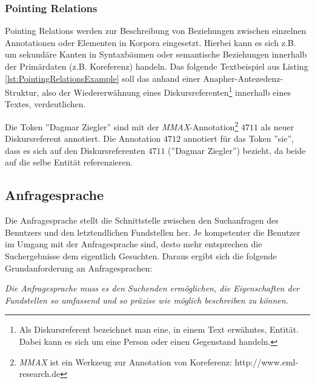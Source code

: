 \subsubsection{Pointing Relations}\label{sec:Pointing Relations}

Pointing Relations werden zur Beschreibung von Beziehungen zwischen einzelnen Annotationen oder Elementen in Korpora eingesetzt. Hierbei kann es sich z.B. um sekundäre Kanten in Syntaxbäumen oder semantische Beziehungen innerhalb der Primärdaten (z.B. Koreferenz) handeln. Das folgende Textbeispiel aus Listing \ref{lst:PointingRelationsExample} soll das anhand einer Anapher-Antezedenz-Struktur, also der Wiedererwähnung eines Diskursreferenten\footnote{Als Diskursreferent bezeichnet man eine, in einem Text erwähntes, Entität. Dabei kann es sich um eine Person oder einen Gegenstand handeln.} innerhalb eines Textes, verdeutlichen.

\newpage
{}



Die Token ''Dagmar Ziegler'' sind mit der \emph{MMAX}-Annotation\footnote{\emph{MMAX} ist ein Werkzeug zur Annotation von Koreferenz: http://www.eml-research.de} $4711$ als neuer Diskursreferent annotiert. Die Annotation $4712$ annotiert für  das Token ''sie'', dass es sich auf den Diskursreferenten $4711$ (''Dagmar Ziegler'') bezieht, da beide auf die selbe Entität referenzieren.

\subsection{Anfragesprache}\label{sec:Korpussuche.Anfragesprache}

Die Anfragesprache stellt die Schnittstelle zwischen den Suchanfragen des Benutzers und den letztendlichen Fundstellen her. Je kompetenter die Benutzer im Umgang mit der Anfragesprache sind, desto mehr entsprechen die Suchergebnisse dem eigentlich Gesuchten. Daraus ergibt sich die folgende Grundanforderung an Anfragesprachen:

\emph{Die Anfragesprache muss es den Suchenden ermöglichen, die Eigenschaften der Fundstellen so umfassend und so präzise wie möglich beschreiben zu können.}


